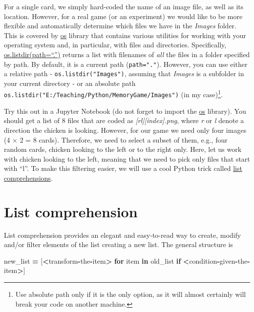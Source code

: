\documentclass[
]{book}
\newenvironment{Shaded}{\begin{snugshade}}{\end{snugshade}}
\newcommand{\ControlFlowTok}[1]{\textcolor[rgb]{0.13,0.29,0.53}{\textbf{#1}}}
\newcommand{\KeywordTok}[1]{\textcolor[rgb]{0.13,0.29,0.53}{\textbf{#1}}}
\newcommand{\NormalTok}[1]{#1}
\newcommand{\OperatorTok}[1]{\textcolor[rgb]{0.81,0.36,0.00}{\textbf{#1}}}
\begin{document}
For a single card, we simply hard-coded the name of an image file, as well as its location. However, for a real game (or an experiment) we would like to be more flexible and automatically determine which files we have in the \emph{Images} folder. This is covered by \href{https://docs.python.org/3/library/os.html}{os} library that contains various utilities for working with your operating system and, in particular, with files and directories. Specifically, \href{https://docs.python.org/3/library/os.html\#os.listdir}{os.listdir(path=``.'')} returns a list with filenames of \emph{all} the files in a folder specified by path. By default, it is a current path (\texttt{path="."}). However, you can use either a relative path - \texttt{os.listdir("Images")}, assuming that \emph{Images} is a subfolder in your current directory - or an absolute path \texttt{os.listdir("E:/Teaching/Python/MemoryGame/Images")} (in my case)\footnote{Use absolute path only if it is the only option, as it will almost certainly will break your code on another machine.}.

Try this out in a Jupyter Notebook (do not forget to import the \href{https://docs.python.org/3/library/os.html\#module-os}{os} library). You should get a list of 8 files that are coded as \emph{{[}r\textbar l{]}{[}index{]}.png}, where \emph{r} or \emph{l} denote a direction the chicken is looking. However, for our game we need only four images (4 × 2 = 8 cards). Therefore, we need to select a subset of them, e.g., four random cards, chicken looking to the left or to the right only. Here, let us work with chicken looking to the left, meaning that we need to pick only files that start with ``l''. To make this filtering easier, we will use a cool Python trick called \href{https://docs.python.org/3/tutorial/datastructures.html\#list-comprehensions}{list comprehensions}.

\hypertarget{list-comprehension}{%
\section{List comprehension}\label{list-comprehension}}

List comprehension provides an elegant and easy-to-read way to create, modify and/or filter elements of the list creating a new list. The general structure is

\begin{Shaded}
\begin{Highlighting}[]
\NormalTok{new\_list }\OperatorTok{=}\NormalTok{ [}\OperatorTok{\textless{}}\NormalTok{transform}\OperatorTok{{-}}\NormalTok{the}\OperatorTok{{-}}\NormalTok{item}\OperatorTok{\textgreater{}} \ControlFlowTok{for}\NormalTok{ item }\KeywordTok{in}\NormalTok{ old\_list }\ControlFlowTok{if} \OperatorTok{\textless{}}\NormalTok{condition}\OperatorTok{{-}}\NormalTok{given}\OperatorTok{{-}}\NormalTok{the}\OperatorTok{{-}}\NormalTok{item}\OperatorTok{\textgreater{}}\NormalTok{]}
\end{Highlighting}
\end{Shaded}
\end{document}
